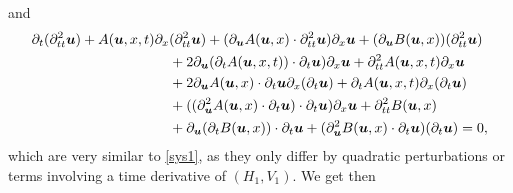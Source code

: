 \documentclass[JEP,XML,SOM,Unicode]{cedram}
\theoremstyle{definition}
\begin{document}
and
\begin{align}
\label{V3}
\partial_{t}(\partial_{tt}^{2}\boldsymbol{u})+A(\boldsymbol{u},x,t)\partial_{x}&(\partial_{tt}^{2}\boldsymbol{u})
+(\partial_{\boldsymbol{u}}A(\boldsymbol{u},x)\cdot\partial_{tt}^{2}\boldsymbol{u})\partial_{x}\boldsymbol{u}
+(\partial_{\boldsymbol{u}}B(\boldsymbol{u},x))(\partial_{tt}^{2}\boldsymbol{u})\\
\notag&+2\partial_{\boldsymbol{u}}(\partial_{t}A(\boldsymbol{u},x,t))\cdot\partial_{t}\boldsymbol{u})\partial_{x}\boldsymbol{u}+\partial_{tt}^{2}A(\boldsymbol{u},x,t)\partial_{x}\boldsymbol{u}\\
\notag&+2\partial_{\boldsymbol{u}}A(\boldsymbol{u},x)\cdot\partial_{t}\boldsymbol{u}\partial_{x}(\partial_{t}\boldsymbol{u})+\partial_{t}A(\boldsymbol{u},x,t)\partial_{x}(\partial_{t}\boldsymbol{u})\\
\notag&+((\partial^{2}_{\boldsymbol{u}}A(\boldsymbol{u},x)\cdot\partial_{t}\boldsymbol{u})\cdot\partial_{t}\boldsymbol{u})\partial_{x}\boldsymbol{u}+\partial_{tt}^{2}B(\boldsymbol{u},x)\\
\notag&+\partial_{\boldsymbol{u}}(\partial_{t}B(\boldsymbol{u},x))\cdot\partial_{t}\boldsymbol{u}
+(\partial^{2}_{\boldsymbol{u}}B(\boldsymbol{u},x)\cdot\partial_{t}\boldsymbol{u})(\partial_{t}\boldsymbol{u})=0,
\end{align}
which are very similar to \eqref{sys1}, as they only differ by quadratic perturbations or terms involving a time derivative of $(H_{1},V_{1})$.
We get then
\end{document}
